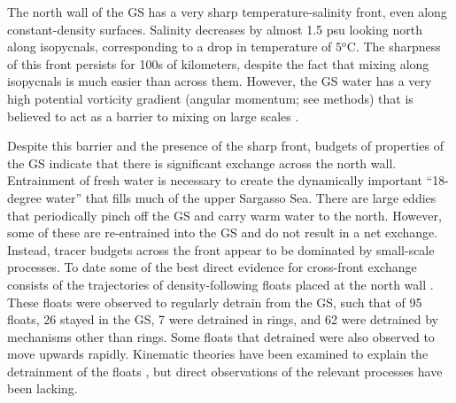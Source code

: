 \documentclass{natureJMK}
\begin{document}
The north wall of the GS has a very sharp temperature-salinity front, even along constant-density surfaces.  Salinity decreases by almost 1.5 psu looking north along isopycnals, corresponding to a drop in temperature of $5\mathrm{^oC}$.   The sharpness of this front persists for 100s of kilometers, despite the fact that mixing along isopycnals is much easier than across them. However, the GS water has a very high potential vorticity gradient (angular momentum; see methods) that is believed to act as a barrier to mixing on large scales \cite{marshalletal06,naveiraetal11}.  

Despite this  barrier and the presence of the sharp front, budgets of properties of the GS indicate that there is significant exchange across the north wall\cite{joyceetal13}.  Entrainment of fresh water is necessary to create the dynamically important ``18-degree water'' that fills much of the upper Sargasso Sea. There are large eddies that periodically pinch off the GS and carry warm water to the north. However, some of these are re-entrained into the GS and do not result in a net exchange. Instead, tracer budgets across the front appear to be dominated by small-scale processes\cite{boweretal85}. To date some of the best direct evidence for cross-front exchange consists of the trajectories of density-following floats placed at the north wall \cite{bowerrossby89,bowerlozier94}.  These floats were observed to regularly detrain from the GS, such that of 95 floats, 26 stayed in the GS, 7 were detrained in rings, and 62 were detrained by mechanisms other than rings\cite{bowerlozier94}.  Some floats that detrained were also observed to move upwards rapidly.  Kinematic theories have been examined to explain the detrainment of the floats \cite{flierletal87,stern85}, but direct observations of the relevant processes have been lacking.  

\end{document}
